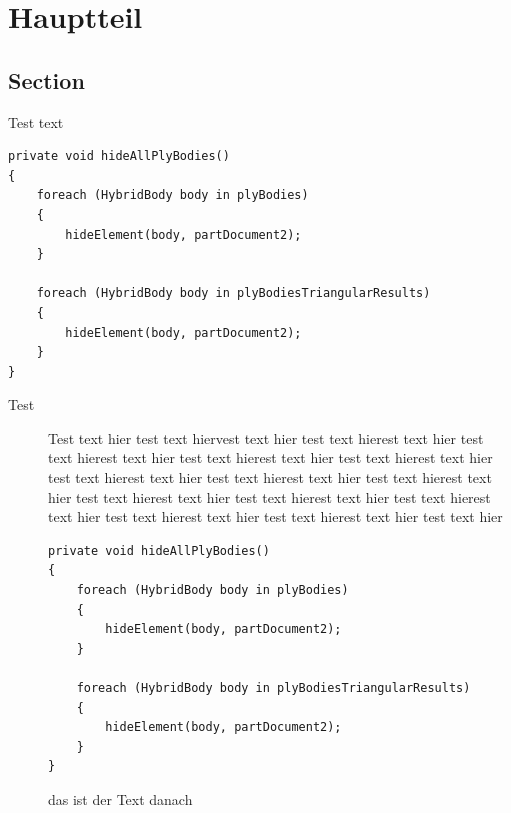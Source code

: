 \documentclass[
                                                                final,
                                                                10pt,
                                                                numbers=noenddot,
                                                                a4paper,
                                                                pagesize,
                                                                oneside,
                                                                ngerman,
                                                                parskip=full-]{scrreprt}
\begin{document}
\chapter{Hauptteil}

\section{Section}
Test text

\begin{lstlisting}[caption=Titel des Codes, label=lst, captionpos=t]
private void hideAllPlyBodies()
{
    foreach (HybridBody body in plyBodies)
    {
        hideElement(body, partDocument2);
    }

    foreach (HybridBody body in plyBodiesTriangularResults)
    {
        hideElement(body, partDocument2);
    }
}
\end{lstlisting}

\begin{description}
        \item[Test] Test text hier test text hiervest text hier test text hierest text hier test text hierest text hier test text hierest text hier test text hierest text hier test text hierest text hier test text hierest text hier test text hierest text hier test text hierest text hier test text hierest text hier test text hierest text hier test text hierest text hier test text hierest text hier test text hier
        
\begin{lstlisting}[caption=Titel des Codes, label=lst, captionpos=t]
private void hideAllPlyBodies()
{
    foreach (HybridBody body in plyBodies)
    {
        hideElement(body, partDocument2);
    }

    foreach (HybridBody body in plyBodiesTriangularResults)
    {
        hideElement(body, partDocument2);
    }
}
\end{lstlisting}

das ist der Text danach

\end{description}
\end{document}
